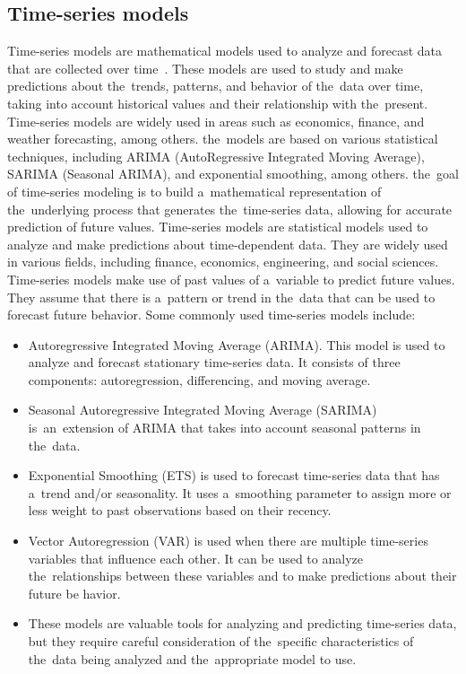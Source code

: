 \subsection{Time-series models}\label{sec:timeseries}
Time-series models are mathematical models used to analyze and forecast data that are collected over time~\cite{Cryer}.
These models are used to study and make predictions about the~trends, patterns, and behavior of the~data over time,
taking into account historical values and their relationship with the~present. Time-series models are widely
used in areas such as economics, finance, and weather forecasting, among others. the~models are based on various
statistical techniques, including ARIMA (AutoRegressive Integrated Moving Average), SARIMA (Seasonal ARIMA),
and exponential smoothing, among others. the~goal of time-series modeling is to build a~mathematical representation
of the~underlying process that generates the~time-series data, allowing for accurate prediction of future values.
Time-series models are statistical models used to analyze and make predictions about time-dependent data. They are
widely used in various fields, including finance, economics, engineering, and social sciences.
\\
Time-series models make use of past values of a~variable to predict future values.
They assume that there is a~pattern or trend in the~data that can be used to forecast future behavior.
Some commonly used time-series models include:
\begin{itemize}
    \item Autoregressive Integrated Moving Average (ARIMA). This model is used to analyze and forecast stationary
    time-series data. It consists of three components: autoregression, differencing, and moving average.
    \item Seasonal Autoregressive Integrated Moving Average (SARIMA) is~an~extension of ARIMA
    that takes into account seasonal patterns in the~data.
    \item Exponential Smoothing (ETS) is used to forecast time-series data that has a~trend
    and/or seasonality. It uses a~smoothing parameter to assign more or less weight to past observations
    based on their recency.
    \item Vector Autoregression (VAR) is used when there are multiple time-series variables
    that influence each other. It can be used to analyze the~relationships between these variables and to make
    predictions about their future be   havior.
    \item These models are valuable tools for analyzing and predicting time-series data, but they require careful
    consideration of the~specific characteristics of the~data being analyzed and the~appropriate model to use.
\end{itemize}

